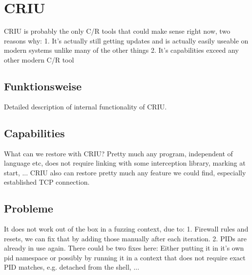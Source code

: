 \documentclass[a4paper]{article}
\begin{document}



\section{CRIU}
CRIU is probably the only C/R tools that could make sense right now, two reasons why: 1. It's actually still getting updates and is actually easily useable on modern systems unlike many of the other things 2. It's capabilities exceed any other modern C/R tool
\subsection{Funktionsweise}
Detailed description of internal functionality of CRIU.
\subsection{Capabilities}
What can we restore with CRIU? Pretty much any program, independent of language etc, does not require linking with some interception library, marking at start, ... CRIU also can restore pretty much any feature we could find, especially established TCP connection.
\subsection{Probleme}
It does not work out of the box in a fuzzing context, due to: 1. Firewall rules and resets, we can fix that by adding those manually after each iteration. 2. PIDs are already in use again. There could be two fixes here: Either putting it in it's own pid namespace or possibly by running it in a context that does not require exact PID matches, e.g. detached from the shell, ...
\end{document}

